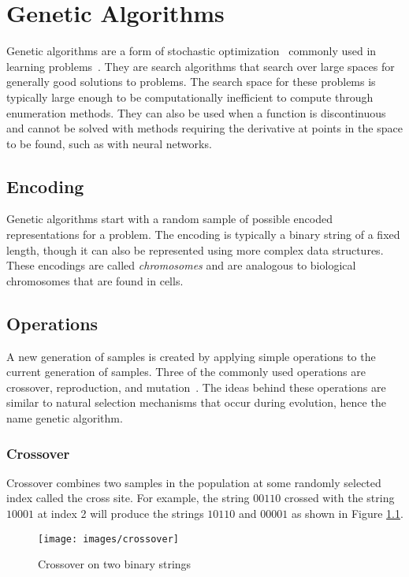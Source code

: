 \chapter[Genetic Algorithms]{Genetic Algorithms}
Genetic algorithms are a form of stochastic optimization~\cite{stochastic} commonly used
in learning problems~\cite{ga1,ga2,ga3}.
They are search algorithms that search over large spaces for generally good solutions to problems.
The search space for these problems is typically large enough to be computationally inefficient to compute through enumeration methods.
They can also be used when a function is discontinuous and cannot be
solved with methods requiring the derivative at points in the
space to be found, such as with neural networks.

\section{Encoding}
Genetic algorithms start with a random sample of possible encoded representations for a problem.
The encoding is typically a binary string of a fixed length, though it can also be represented using more complex data structures.
These encodings are called {\it chromosomes} and are analogous to biological chromosomes that are found in cells.

\section{Operations}
A new generation of samples is created by applying simple operations to the current generation of samples. 
Three of the commonly used operations are crossover, reproduction, and
mutation~\cite[62-65]{goldberg}.
The ideas behind these operations are similar to natural selection mechanisms that occur during evolution, hence the name genetic algorithm. 

\subsection{Crossover}
Crossover combines two samples in the population at some randomly selected index called the cross site. 
For example, the string $00110$ crossed with the string $10001$ at index 2 will produce the strings $10110$ and $00001$ as shown in Figure \ref{crossover}.

\begin{figure}[h!]
  \centering
  \texttt{[image: images/crossover]}
  \caption{Crossover on two binary strings}
  \label{crossover}
\end{figure}

